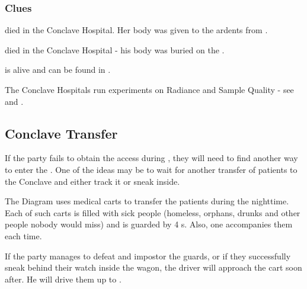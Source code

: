 \subsubsection{Clues}

\npcOrphanSick{} died in the Conclave Hospital. Her body was given to the ardents from .

\npcKharbranthNoble{} died in the Conclave Hospital - his body was buried on the .

\npcGhostbloodWounded{} is alive and can be found in .

The Conclave Hospitals run experiments on Radiance and Sample Quality - see  and .



\subsection{Conclave Transfer}
\label{ssec:cityHospitalConclaveTransfer}

If the party fails to obtain the \locationPalanaeum{} access during , they will need to find another way to enter the . One of the ideas may be to wait for another transfer of patients to the Conclave and either track it or sneak inside.

The Diagram uses medical carts to transfer the patients during the nighttime. Each of such carts is filled with sick people (homeless, orphans, drunks and other people  nobody would miss) and is guarded by 4 \enemyDiagramMuscle{}s. Also, one \enemyDiagramSurgeon{} accompanies them each time.

If the party manages to defeat and impostor the guards, or if they successfully sneak behind their watch inside the wagon, the driver will approach the cart soon after. He will drive them up to .
